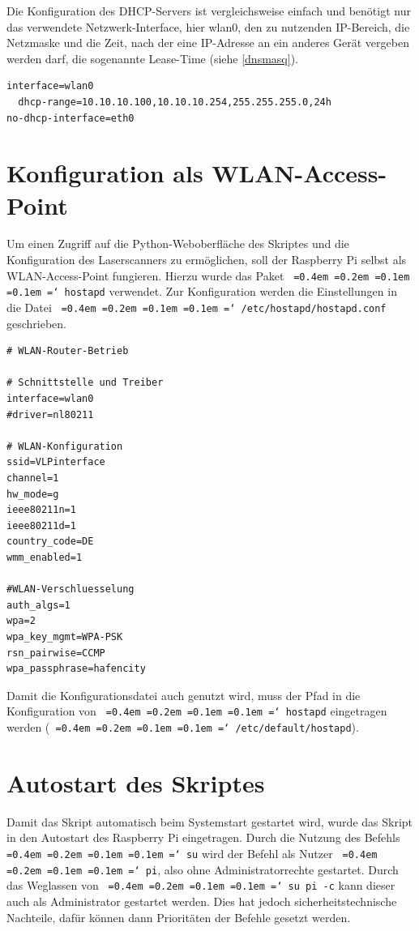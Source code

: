\documentclass[a4paper,12pt,bibliography=totoc, listof=totoc,titlepage,pointlessnumbers]{scrreprt}
\newcommand*\justify{%
  \fontdimen2\font=0.4em%
  \fontdimen3\font=0.2em%
  \fontdimen4\font=0.1em%
  \fontdimen7\font=0.1em%
  \hyphenchar\font=`\-%
}
\newcommand{\code}[1]{\texttt{\justify{#1}}}
\begin{document}
Die Konfiguration des DHCP-Servers ist vergleichsweise einfach und benötigt nur das verwendete Netzwerk-Interface, hier wlan0, den zu nutzenden IP-Bereich, die Netzmaske und die Zeit, nach der eine IP-Adresse an ein anderes Gerät vergeben werden darf, die sogenannte Lease-Time (siehe \autoref{dnsmasq}). \citep{accesspoint}

  
\begin{lstlisting}[caption={Konfiguration der \code{/etc/dnsmasq.conf}}, label={dnsmasq}]
interface=wlan0
  dhcp-range=10.10.10.100,10.10.10.254,255.255.255.0,24h
no-dhcp-interface=eth0
\end{lstlisting}

\section{Konfiguration als WLAN-Access-Point}
Um einen Zugriff auf die Python-Weboberfläche des Skriptes und die Konfiguration des Laser\-scan\-ners zu ermöglichen, soll der Rasp\-berry Pi selbst als WLAN-Access-Point fungieren. Hierzu wurde das Paket \code{hostapd} verwendet. Zur Konfiguration werden die Einstellungen in die Datei \code{/etc/hostapd/hostapd.conf} geschrieben. \citep{accesspoint}

\begin{lstlisting}[caption={Konfiguration der \code{/etc/hostapd/hostapd.conf}}, label={hostapd}]
# WLAN-Router-Betrieb

# Schnittstelle und Treiber
interface=wlan0
#driver=nl80211

# WLAN-Konfiguration
ssid=VLPinterface
channel=1
hw_mode=g
ieee80211n=1
ieee80211d=1
country_code=DE
wmm_enabled=1

#WLAN-Verschluesselung
auth_algs=1
wpa=2
wpa_key_mgmt=WPA-PSK
rsn_pairwise=CCMP
wpa_passphrase=hafencity
\end{lstlisting}

Damit die Konfigurationsdatei auch genutzt wird, muss der Pfad in die Konfiguration von \code{hostapd} eingetragen werden (\code{/etc/default/hostapd}).


\section{Autostart des Skriptes}
Damit das Skript automatisch beim Systemstart gestartet wird, wurde das Skript in den Autostart des Rasp\-berry Pi eingetragen. Durch die Nutzung des Befehls \code{su} wird der Befehl als Nutzer \code{pi}, also ohne Administratorrechte gestartet. Durch das Weglassen von \code{su pi -c} kann dieser auch als Administrator gestartet werden. Dies hat jedoch sicherheitstechnische Nachteile, dafür können dann Prioritäten der Befehle gesetzt werden.
\end{document}
